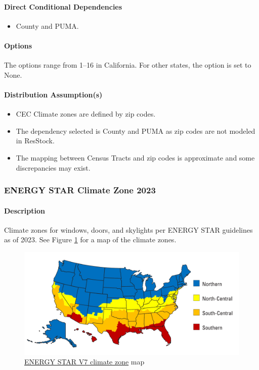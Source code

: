 \paragraph{Direct Conditional Dependencies}
\begin{itemize}
    \item County and PUMA.
\end{itemize}

\paragraph{Options}
The options range from 1--16 in California. For other states, the option is set to None.

\paragraph{Distribution Assumption(s)}
\begin{itemize}
    \item CEC Climate zones are defined by zip codes.
    \item The dependency selected is County and PUMA as zip codes are not modeled in ResStock.
    \item The mapping between Census Tracts and zip codes is approximate and some discrepancies may exist.
\end{itemize}

\subsubsection{ENERGY STAR Climate Zone 2023}
\paragraph{Description}
Climate zones for windows, doors, and skylights per ENERGY STAR guidelines as of 2023. See Figure \ref{fig:energy_star_cz} for a map of the climate zones.

\begin{figure}
    \centering
    \includegraphics[width=1\linewidth]{images/ENERGY_STAR_Climate_Zone_Map.pdf}    \caption{\href{https://www.energystar.gov/sites/default/files/asset/document/Promotional_Map.pdf}{ENERGY STAR V7 climate zone} map}
    \label{fig:energy_star_cz}
\end{figure}

